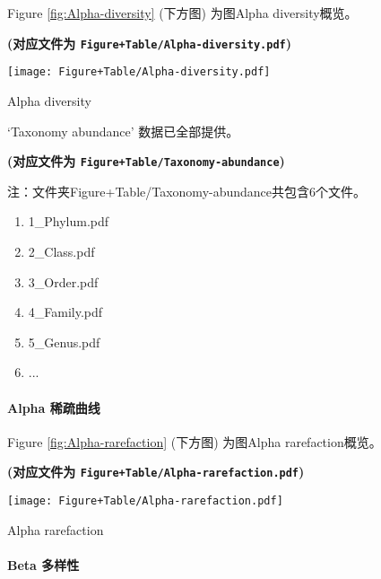 \documentclass[
]{article}
\providecommand{\tightlist}{%
  \setlength{\itemsep}{0pt}\setlength{\parskip}{0pt}}
\begin{document}
Figure \ref{fig:Alpha-diversity} (下方图) 为图Alpha diversity概览。

\textbf{(对应文件为 \texttt{Figure+Table/Alpha-diversity.pdf})}

\def\@captype{figure}
\begin{center}
\texttt{[image: Figure+Table/Alpha-diversity.pdf]}
\caption{Alpha diversity}\label{fig:Alpha-diversity}
\end{center}

`Taxonomy abundance' 数据已全部提供。

\textbf{(对应文件为 \texttt{Figure+Table/Taxonomy-abundance})}

\begin{center}\begin{tcolorbox}[colback=gray!10, colframe=gray!50, width=0.9\linewidth, arc=1mm, boxrule=0.5pt]注：文件夹Figure+Table/Taxonomy-abundance共包含6个文件。

\begin{enumerate}\tightlist
\item 1\_Phylum.pdf
\item 2\_Class.pdf
\item 3\_Order.pdf
\item 4\_Family.pdf
\item 5\_Genus.pdf
\item ...
\end{enumerate}\end{tcolorbox}
\end{center}

\hypertarget{alpha-ux7a00ux758fux66f2ux7ebf}{%
\paragraph{Alpha 稀疏曲线}\label{alpha-ux7a00ux758fux66f2ux7ebf}}

Figure \ref{fig:Alpha-rarefaction} (下方图) 为图Alpha rarefaction概览。

\textbf{(对应文件为 \texttt{Figure+Table/Alpha-rarefaction.pdf})}

\def\@captype{figure}
\begin{center}
\texttt{[image: Figure+Table/Alpha-rarefaction.pdf]}
\caption{Alpha rarefaction}\label{fig:Alpha-rarefaction}
\end{center}

\hypertarget{beta}{%
\paragraph{Beta 多样性}\label{beta}}
\end{document}

